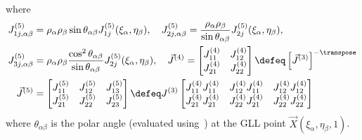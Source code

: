 where
\begin{align*}
	 J^{(5)}_{1j,\alpha\beta} &= \rho_\alpha\rho_\beta\sin\theta_{\alpha\beta} J^{(5)}_{1j}(\xi_\alpha,\eta_\beta),\quad J^{(5)}_{2j,\alpha\beta} = \frac{\rho_\alpha\rho_\beta}{\sin\theta_{\alpha\beta} } J^{(5)}_{2j}(\xi_\alpha,\eta_\beta),\\
	 J^{(5)}_{3j,\alpha\beta} &= \rho_\alpha\rho_\beta\frac{\cos^2\theta_{\alpha\beta}}{\sin\theta_{\alpha\beta} } J^{(5)}_{2j}(\xi_\alpha,\eta_\beta),\quad
	 \vec{J}^{(4)} = \begin{bmatrix}
	 	J_{11}^{(4)} & J_{12}^{(4)}\\
	 	J_{21}^{(4)} & J_{22}^{(4)}
\end{bmatrix}	\defeq  \left[\vec{J}^{(3)}\right]^{-\transpose}\\
	 \vec{J}^{(5)} &= \begin{bmatrix}
	 	J_{11}^{(5)} & J_{12}^{(5)} & J_{13}^{(5)}\\
	 	J_{21}^{(5)} & J_{22}^{(5)} & J_{23}^{(5)}
\end{bmatrix} \defeq J^{(3)}\begin{bmatrix}
	 	J_{11}^{(4)}J_{11}^{(4)} & J_{12}^{(4)}J_{11}^{(4)} & J_{12}^{(4)}J_{12}^{(4)}\\
	 	J_{21}^{(4)}J_{21}^{(4)} & J_{22}^{(4)}J_{21}^{(4)} & J_{22}^{(4)}J_{22}^{(4)}
	 \end{bmatrix}
\end{align*}
where $\theta_{\alpha\beta}$ is the polar angle (evaluated using~\cite[Equation (A.4)]{Venas2018iao}) at the GLL point $\vec{X}(\xi_\alpha,\eta_\beta,1)$. 